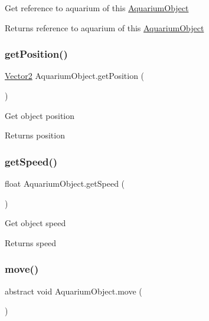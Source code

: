 Get reference to aquarium of this \mbox{\hyperlink{class_aquarium_object}{Aquarium\+Object}} \begin{DoxyReturn}{Returns}
reference to aquarium of this \mbox{\hyperlink{class_aquarium_object}{Aquarium\+Object}} 
\end{DoxyReturn}
\mbox{\label{class_aquarium_object_af309f1ea5f4ce452d94068ed6e40db3b}} 
\subsubsection{\texorpdfstring{get\+Position()}{getPosition()}}
{\footnotesize\ttfamily \mbox{\hyperlink{class_vector2}{Vector2}} Aquarium\+Object.\+get\+Position (\begin{DoxyParamCaption}{ }\end{DoxyParamCaption})\hspace{0.3cm}{\ttfamily [inline]}}

Get object position \begin{DoxyReturn}{Returns}
position 
\end{DoxyReturn}
\mbox{\label{class_aquarium_object_afa94a029183090fbbae21e81f06f181b}} 
\subsubsection{\texorpdfstring{get\+Speed()}{getSpeed()}}
{\footnotesize\ttfamily float Aquarium\+Object.\+get\+Speed (\begin{DoxyParamCaption}{ }\end{DoxyParamCaption})\hspace{0.3cm}{\ttfamily [inline]}}

Get object speed \begin{DoxyReturn}{Returns}
speed 
\end{DoxyReturn}
\mbox{\label{class_aquarium_object_a3847ea02c5aa433f9164682250a46182}} 
\subsubsection{\texorpdfstring{move()}{move()}}
{\footnotesize\ttfamily abstract void Aquarium\+Object.\+move (\begin{DoxyParamCaption}{ }\end{DoxyParamCaption})\hspace{0.3cm}{\ttfamily [abstract]}}


